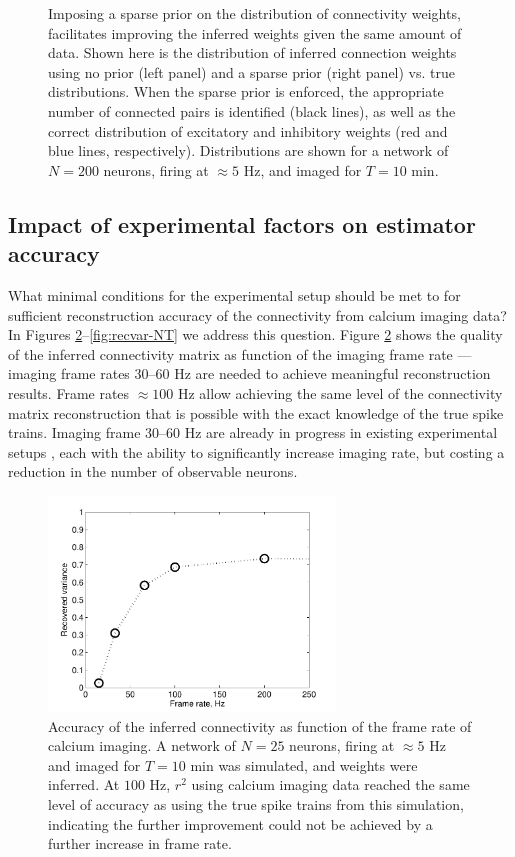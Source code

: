 \documentclass[aoas,preprint]{imsart}
\begin{document}
\begin{figure}[h]
\begin{minipage}[c]{0.45\hsize}
\end{minipage}
\caption{Imposing a sparse prior on the distribution of connectivity weights, facilitates improving the inferred weights given the same amount of data. Shown here is the distribution of inferred connection weights using no prior (left panel) and a sparse prior (right panel) vs. true distributions. When the sparse prior is enforced, the appropriate number of connected pairs is identified (black lines), as well as the correct distribution of excitatory and inhibitory weights (red and blue lines, respectively). Distributions are shown for a network of $N=200$ neurons, firing at $\approx 5$ Hz, and imaged for $T=10$ min.}
\label{fig:distros}
\end{figure}


\subsection{Impact of experimental factors on estimator accuracy}

What minimal conditions for the experimental setup should be met to for sufficient reconstruction accuracy of the connectivity from calcium imaging data? In Figures \ref{fig:recvar}--\ref{fig:recvar-NT} we address this question. Figure \ref{fig:recvar} shows the quality of the inferred connectivity matrix as function of the imaging frame rate --- imaging frame rates $30$--$60$ Hz are needed to achieve meaningful reconstruction results. Frame rates $\approx 100$ Hz allow achieving the same level of the connectivity matrix reconstruction that is possible with the exact knowledge of the true spike trains. Imaging frame $30$--$60$ Hz are already in progress in existing experimental setups \cite{NguyenParker01,ReddySaggau05,Iyer06,SalomeBourdieu06,ReddySaggau08}, each with the ability to significantly increase imaging rate, but costing a reduction in the number of observable neurons.

\begin{figure}[h]
\centering
\includegraphics[width=3in]{../figs/FigureA5_recvar}
\caption{Accuracy of the inferred connectivity as function of the frame rate of calcium imaging.  A network of $N=25$ neurons, firing at $\approx 5$ Hz and imaged for $T=10$ min was simulated, and weights were inferred. At $100$ Hz, $r^2$ using calcium imaging data reached the same level of accuracy as using the true spike trains from this simulation, indicating the further improvement could not be achieved by a further increase in frame rate.}
\label{fig:recvar}
\end{figure}
\end{document}
